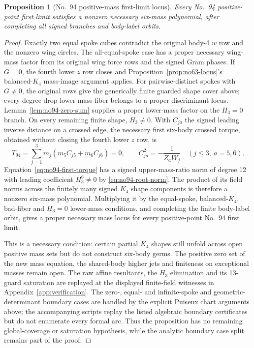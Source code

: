 \documentclass[11pt]{amsart}
\newtheorem{proposition}[theorem]{Proposition}
\theoremstyle{remark}
\begin{document}
\begin{proposition}[No.~94 positive-mass first-limit locus]\label{prop:no94-locus}
Every No.~94 positive-point first limit satisfies a nonzero necessary six-mass polynomial, after completing all signed branches and body-label orbits.
\end{proposition}
\begin{proof}
Exactly two equal spoke cubes contradict the original body-4 $w$ row and the nonzero wing circles. The all-equal-spoke case has a proper necessary wing-mass factor from its original wing force rows and the signed Gram phases. If $G=0$, the fourth lower $z$ row closes and Proposition~\ref{prop:no63-locus}'s balanced-$K_4$ mass-image argument applies. For pairwise-distinct spokes with $G\ne0$, the original rows give the generically finite guarded shape cover above; every degree-drop lower-mass fiber belongs to a proper discriminant locus. Lemma~\ref{lem:no94-zero-sum} supplies a proper lower-mass factor on the $H_3=0$ branch. On every remaining finite shape, $H_3\ne0$. With $C_{ja}$ the signed leading inverse distance on a crossed edge, the necessary first six-body crossed torque, obtained without closing the fourth lower $z$ row, is
\begin{equation}\label{eq:no94-first-torque}
T_{94}=\sum_{j=1}^3m_j(m_5C_{j5}+m_6C_{j6})=0,
\qquad C_{ja}^2=-\frac1{Z_aW_j}\quad(j\le3,\ a=5,6).
\end{equation}
Equation~\eqref{eq:no94-first-torque} has a signed upper-mass-ratio norm of degree 12 with leading coefficient $H_3^6\ne0$ by \eqref{eq:no94-root-norm}. The product of its field norms across the finitely many signed $K_4$ shape components is therefore a nonzero six-mass polynomial. Multiplying it by the equal-spoke, balanced-$K_4$, bad-fiber and $H_3=0$ lower-mass conditions, and completing the finite body-label orbit, gives a proper necessary mass locus for every positive-point No.~94 first limit.

This is a necessary condition: certain partial $K_4$ shapes still unfold across open positive mass sets but do not construct six-body germs. The positive zero set of the new mass equation, the shared-body higher jets and finiteness on exceptional masses remain open. The raw affine resultants, the $H_3$ elimination and its 13-guard saturation are replayed at the displayed finite-field witnesses in Appendix~\ref{app:verification}. The zero-, equal- and infinite-spoke and geometric-determinant boundary cases are handled by the explicit Puiseux chart arguments above; the accompanying scripts replay the listed algebraic boundary certificates but do not enumerate every formal arc. Thus the proposition has no remaining global-coverage or saturation hypothesis, while the analytic boundary case split remains part of the proof.
\end{proof}
\end{document}
